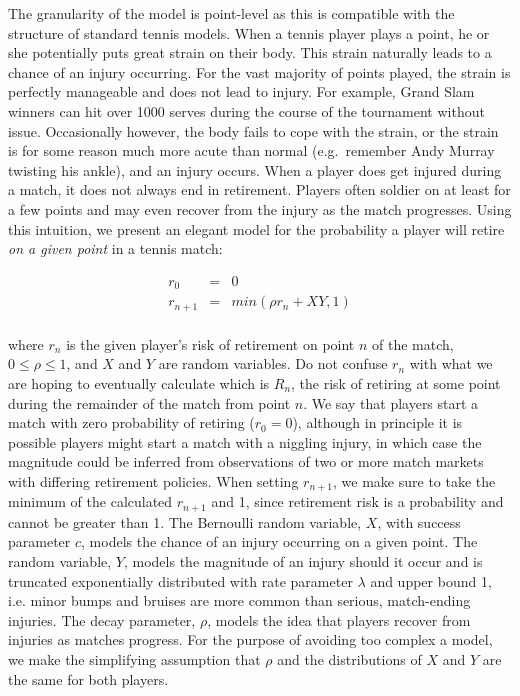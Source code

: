 \documentclass[letterpaper,12pt]{article}
\begin{document}
The granularity of the model is point-level as this is compatible with the structure of standard tennis models.  When a tennis player plays a point, he or she potentially puts great strain on their body.  This strain naturally leads to a chance of an injury occurring.  For the vast majority of points played, the strain is perfectly manageable and does not lead to injury.  For example, Grand Slam winners can hit over 1000 serves during the course of the tournament without issue.  Occasionally however, the body fails to cope with the strain, or the strain is for some reason much more acute than normal (e.g.\ remember Andy Murray twisting his ankle), and an injury occurs.  When a player does get injured during a match, it does not always end in retirement.  Players often soldier on at least for a few points and may even recover from the injury as the match progresses.  
Using this intuition, we present an elegant model for the probability a player will retire \textit{on a given point} in a tennis match:

\begin{center}
\begin{eqnarray*}
r_0 &=& 0 \\
r_{n+1} &=& min(\rho r_n + XY, 1) \\
\end{eqnarray*}
\end{center}

where $r_n$ is the given player's risk of retirement on point $n$ of the match, $0 \leq \rho \leq 1$, and $X$ and $Y$ are random variables.  Do not confuse $r_n$ with what we are hoping to eventually calculate which is $R_n$, the risk of retiring at some point during the remainder of the match from point $n$.  We say that players start a match with zero probability of retiring ($r_0 = 0$), although in principle it is possible players might start a match with a niggling injury, in which case the magnitude could be inferred from observations of two or more match markets with differing retirement policies.  When setting $r_{n+1}$, we make sure to take the minimum of the calculated $r_{n+1}$ and 1, since retirement risk is a probability and cannot be greater than 1.  The Bernoulli random variable, $X$, with success parameter $c$, models the chance of an injury occurring on a given point.  The random variable, $Y$, models the magnitude of an injury should it occur and is truncated exponentially distributed with rate parameter $\lambda$ and upper bound 1, i.e. minor bumps and bruises are more common than serious, match-ending injuries.  The decay parameter, $\rho$, models the idea that players recover from injuries as matches progress.  For the purpose of avoiding too complex a model, we make the simplifying assumption that $\rho$ and the distributions of $X$ and $Y$ are the same for both players.
\end{document}
